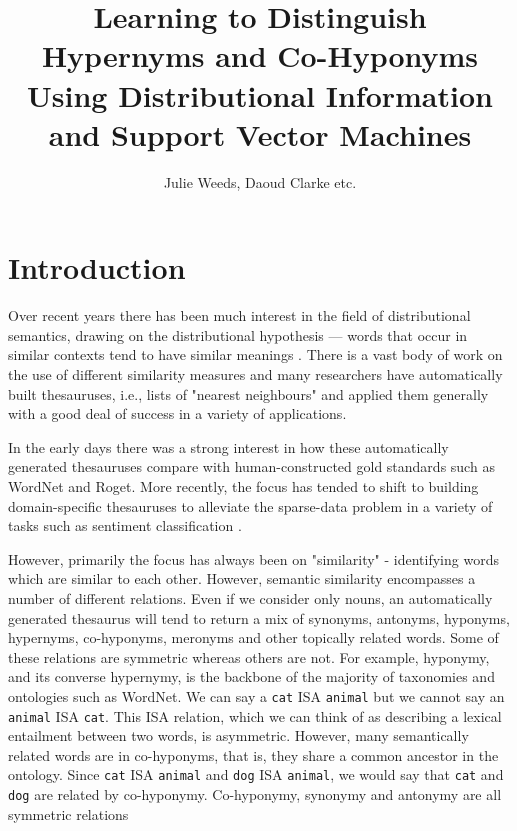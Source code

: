 \documentclass[11pt]{article}
\title{Learning to Distinguish Hypernyms and Co-Hyponyms Using Distributional Information and Support Vector Machines}
\author{Julie Weeds, Daoud Clarke etc.}
\date{} %
\begin{document}
\maketitle

\begin{abstract}
\end{abstract}
\section{Introduction}

Over recent years there has been much interest in the field of distributional semantics, drawing on the distributional hypothesis ---  words that occur in similar contexts tend to have similar meanings \cite{Harris1954}.   There is a vast body of work on the use of different similarity measures \cite{Lee1999,Weeds2003,Curran2004} and many researchers have automatically built thesauruses, i.e., lists of "nearest neighbours" and applied them generally with a good deal of success in a variety of applications.

In the early days there was a strong interest in how these automatically generated thesauruses compare with human-constructed gold standards such as WordNet and Roget\cite{Lin1998,Kilgarriff2000}.  More recently, the focus has tended to shift to building domain-specific thesauruses to alleviate the sparse-data problem in a variety of tasks such as sentiment classification \cite{Bollegala2011}.  

However, primarily the focus has always been on "similarity" - identifying words which are similar to each other. However, semantic similarity encompasses a number of different relations.  Even if we consider only nouns, an automatically generated thesaurus will tend to return a mix of synonyms, antonyms, hyponyms, hypernyms, co-hyponyms, meronyms and other topically related words.  Some of these relations are symmetric whereas others are not.  For example, hyponymy, and its converse hypernymy, is the backbone of the majority of taxonomies and ontologies such as WordNet.  We can say a \texttt{cat} ISA \texttt{animal}  but we cannot say an \texttt{animal} ISA \texttt{cat}.  This ISA relation, which we can think of  as describing a lexical entailment\cite{Geffet2005}  between two words, is asymmetric.  However, many semantically related words are in co-hyponyms, that is, they share a common ancestor in the ontology.  Since \texttt{cat} ISA \texttt{animal} and \texttt{dog} ISA \texttt{animal}, we would say that \texttt{cat} and \texttt{dog} are related by co-hyponymy.  Co-hyponymy, synonymy and antonymy are all symmetric relations 
\end{document}
